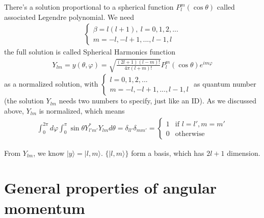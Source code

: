 \documentclass[UTF8,12pt]{article} %
\begin{document}
There's a solution proportional to a spherical function $P_{l}^{m}(\cos\theta)$ called associated Legendre polynomial. We need
\begin{align}
\begin{cases}
\beta = l(l+1),~ l = 0,1,2,... \\
m = -l, -l+1, ..., l-1, l
\end{cases}
\end{align}
the full solution is called Spherical Harmonics function
\begin{align}
Y_{lm} = y(\theta,\varphi) = \sqrt{\frac{(2l+1)(l-m)!}{4\pi(l+m)!}}P_{l}^{m}(\cos\theta) e^{im\varphi}
\end{align}
as a normalized solution, with $\begin{cases}l = 0,1,2,...\\m = -l, -l+1,..., l-1, l\end{cases}$ as quantum number (the solution $Y_{lm}$ needs two numbers to specify, just like an ID). As we discussed above, $Y_{lm}$ is normalized, which means
\begin{align}
\int_{0}^{2\pi} d\varphi \int_{0}^{\pi} \sin\theta Y_{l'm'}^{*} Y_{lm} d\theta = \delta_{ll'}\delta_{mm'} = \begin{cases}1&\text{if }l=l', m=m'\\0&\text{otherwise}\end{cases}
\end{align}

From $Y_{lm}$, we know $|y\rangle = |l,m\rangle$. $\{|l,m\rangle\}$ form a basis, which has $2l + 1$ dimension.

\section{General properties of angular momentum}
\end{document}
